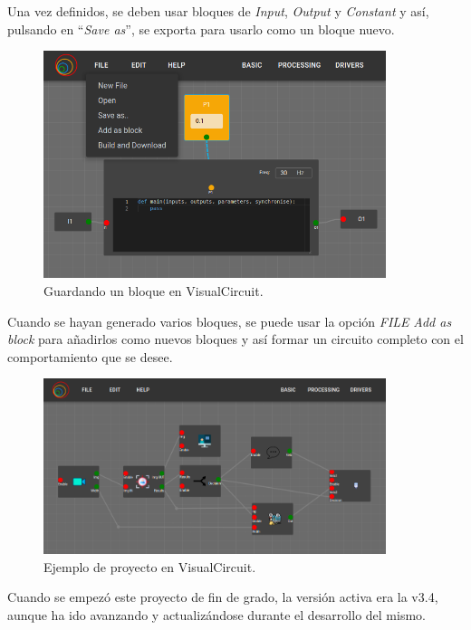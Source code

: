 Una vez definidos, se deben usar bloques de \textit{Input}, \textit{Output} y \textit{Constant} y así, pulsando en ``\textit{Save as}'',
se exporta para usarlo como un bloque nuevo.
\begin{figure} [H]
  \begin{center}
      \includegraphics[width=10cm]{figs/c4/VC_saveas.png}
  \end{center}
  \caption[Guardando un bloque en VisualCircuit]{Guardando un bloque en VisualCircuit.}
  \label{fig:VC_saveas_bloque}
\end{figure}

Cuando se hayan generado varios bloques, se puede usar la opción \textit{FILE} \overrightarrow{ } \textit{Add as block} para añadirlos como nuevos bloques
y así formar un circuito completo con el comportamiento que se desee.
\begin{figure} [H]
  \begin{center}
      \includegraphics[width=10cm]{figs/c4/VC_example.png}
  \end{center}
  \caption[Ejemplo de proyecto en VisualCircuit]{Ejemplo de proyecto en VisualCircuit.}
  \label{fig:VC_example}
\end{figure}

Cuando se empezó este proyecto de fin de grado, la versión activa era la v3.4, aunque ha ido avanzando y actualizándose durante el desarrollo del mismo.




